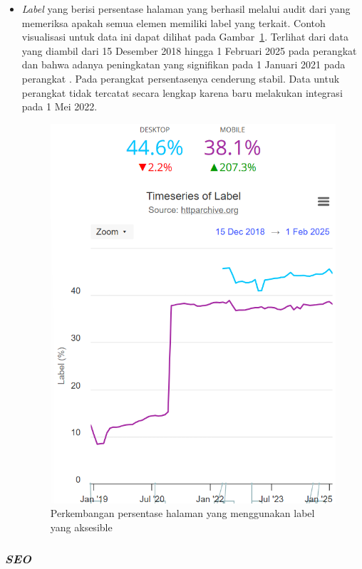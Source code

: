 \begin{itemize}
    
    \item \textit{Label} yang berisi persentase halaman yang berhasil melalui audit dari \light yang memeriksa apakah semua elemen memiliki label yang terkait. Contoh visualisasi untuk data ini dapat dilihat pada Gambar~\ref{fig:label}. Terlihat dari data yang diambil dari 15 Desember 2018 hingga 1 Februari 2025 pada perangkat \desktop dan \mobile bahwa adanya peningkatan yang signifikan pada 1 Januari 2021 pada perangkat \mobile. Pada perangkat \desktop persentasenya cenderung stabil. Data untuk perangkat \desktop tidak tercatat secara lengkap karena \light baru melakukan integrasi pada 1 Mei 2022.
    \begin{figure}[H]
        \centering
        \includegraphics[width=0.4\linewidth]{Gambar/Contoh Label.png}
        \caption{Perkembangan persentase halaman yang menggunakan label yang aksesible}
        \label{fig:label}
    \end{figure}

\end{itemize}


\subsubsection{\textit{SEO}}
\label{subsub:seo}

